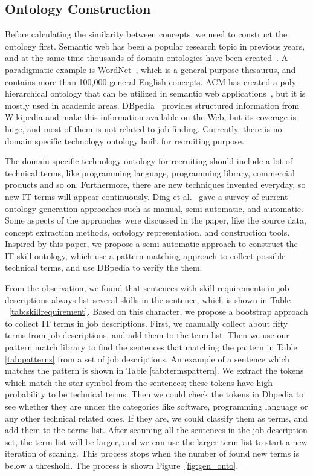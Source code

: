 \subsection{Ontology Construction}

Before calculating the similarity between concepts, we need to construct the ontology first. Semantic web has been a popular research topic in previous years, and at the same time thousands of domain ontologies have been created~\cite{ding2004swoogle}. A paradigmatic example is WordNet~\cite{fellbaum1998wordnet}, which is a general purpose thesaurus, and contains more than 100,000 general English concepts. ACM has created a poly-hierarchical ontology that can be utilized in semantic web applications~\cite{acm2012class}, but it is mostly used in academic areas. DBpedia~\cite{bizer2009dbpedia} provides structured information from Wikipedia and make this information available on the Web, but its coverage is huge, and most of them is not related to job finding. Currently, there is no domain specific technology ontology built for recruiting purpose.

The domain specific technology ontology for recruiting should include a lot of technical terms, like programming language, programming library, commercial products and so on. Furthermore, there are new techniques invented everyday, so new IT terms will appear continuously. Ding et al.~\cite{ding2002ontology} gave a survey of current ontology generation approaches such as manual, semi-automatic, and automatic. Some aspects of the approaches were discussed in the paper, like the source data, concept extraction methods, ontology representation, and construction tools. Inspired by this paper, we propose a semi-automatic approach to construct the IT skill ontology, which use a pattern matching approach to collect possible technical terms, and use DBpedia to verify the them.

From the observation, we found that sentences with skill requirements in job descriptions always list several skills in the sentence, which is shown in Table ~\ref{tab:skillrequirement}. Based on this character, we propose a bootstrap approach to collect IT terms in job descriptions.  First, we manually collect about fifty terms from job descriptions, and add them to the term list. Then we use our pattern match library to find the sentences that matching the pattern in Table \ref{tab:patterns} from a set of job descriptions. An example of a sentence which matches the pattern is shown in Table \ref{tab:termspattern}. We extract the tokens which match the star symbol from the sentences; these tokens have high probability to be technical terms. Then we could check the tokens in Dbpedia to see whether they are under the categories like software, programming language or any other technical related ones. If they are, we could classify them as terms, and add them to the terms list. After scanning all the sentences in the job description set, the term list will be larger, and we can use the larger term list to start a new iteration of scaning. This process stops when the number of found new terms is below a threshold. The process is shown Figure~\ref{fig:gen_onto}.

